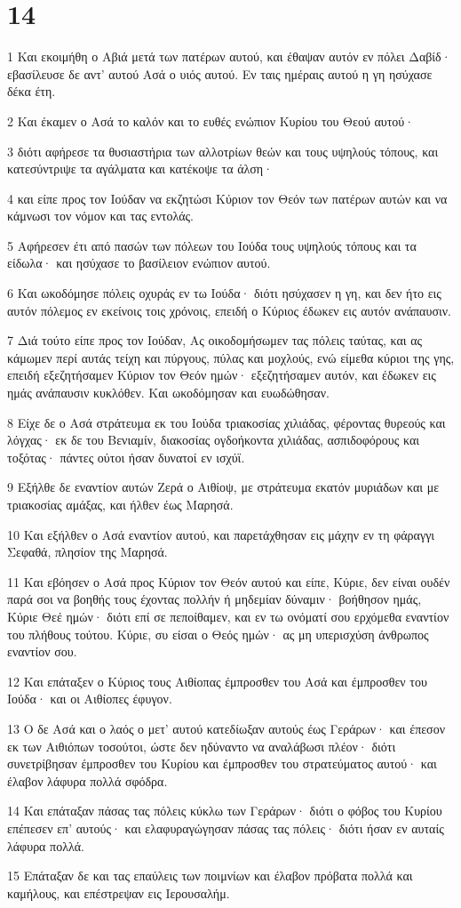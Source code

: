 \chapter{14}

\par 1 Και εκοιμήθη ο Αβιά μετά των πατέρων αυτού, και έθαψαν αυτόν εν πόλει Δαβίδ· εβασίλευσε δε αντ' αυτού Ασά ο υιός αυτού. Εν ταις ημέραις αυτού η γη ησύχασε δέκα έτη.
\par 2 Και έκαμεν ο Ασά το καλόν και το ευθές ενώπιον Κυρίου του Θεού αυτού·
\par 3 διότι αφήρεσε τα θυσιαστήρια των αλλοτρίων θεών και τους υψηλούς τόπους, και κατεσύντριψε τα αγάλματα και κατέκοψε τα άλση·
\par 4 και είπε προς τον Ιούδαν να εκζητώσι Κύριον τον Θεόν των πατέρων αυτών και να κάμνωσι τον νόμον και τας εντολάς.
\par 5 Αφήρεσεν έτι από πασών των πόλεων του Ιούδα τους υψηλούς τόπους και τα είδωλα· και ησύχασε το βασίλειον ενώπιον αυτού.
\par 6 Και ωκοδόμησε πόλεις οχυράς εν τω Ιούδα· διότι ησύχασεν η γη, και δεν ήτο εις αυτόν πόλεμος εν εκείνοις τοις χρόνοις, επειδή ο Κύριος έδωκεν εις αυτόν ανάπαυσιν.
\par 7 Διά τούτο είπε προς τον Ιούδαν, Ας οικοδομήσωμεν τας πόλεις ταύτας, και ας κάμωμεν περί αυτάς τείχη και πύργους, πύλας και μοχλούς, ενώ είμεθα κύριοι της γης, επειδή εξεζητήσαμεν Κύριον τον Θεόν ημών· εξεζητήσαμεν αυτόν, και έδωκεν εις ημάς ανάπαυσιν κυκλόθεν. Και ωκοδόμησαν και ευωδώθησαν.
\par 8 Είχε δε ο Ασά στράτευμα εκ του Ιούδα τριακοσίας χιλιάδας, φέροντας θυρεούς και λόγχας· εκ δε του Βενιαμίν, διακοσίας ογδοήκοντα χιλιάδας, ασπιδοφόρους και τοξότας· πάντες ούτοι ήσαν δυνατοί εν ισχύϊ.
\par 9 Εξήλθε δε εναντίον αυτών Ζερά ο Αιθίοψ, με στράτευμα εκατόν μυριάδων και με τριακοσίας αμάξας, και ήλθεν έως Μαρησά.
\par 10 Και εξήλθεν ο Ασά εναντίον αυτού, και παρετάχθησαν εις μάχην εν τη φάραγγι Σεφαθά, πλησίον της Μαρησά.
\par 11 Και εβόησεν ο Ασά προς Κύριον τον Θεόν αυτού και είπε, Κύριε, δεν είναι ουδέν παρά σοι να βοηθής τους έχοντας πολλήν ή μηδεμίαν δύναμιν· βοήθησον ημάς, Κύριε Θεέ ημών· διότι επί σε πεποίθαμεν, και εν τω ονόματί σου ερχόμεθα εναντίον του πλήθους τούτου. Κύριε, συ είσαι ο Θεός ημών· ας μη υπερισχύση άνθρωπος εναντίον σου.
\par 12 Και επάταξεν ο Κύριος τους Αιθίοπας έμπροσθεν του Ασά και έμπροσθεν του Ιούδα· και οι Αιθίοπες έφυγον.
\par 13 Ο δε Ασά και ο λαός ο μετ' αυτού κατεδίωξαν αυτούς έως Γεράρων· και έπεσον εκ των Αιθιόπων τοσούτοι, ώστε δεν ηδύναντο να αναλάβωσι πλέον· διότι συνετρίβησαν έμπροσθεν του Κυρίου και έμπροσθεν του στρατεύματος αυτού· και έλαβον λάφυρα πολλά σφόδρα.
\par 14 Και επάταξαν πάσας τας πόλεις κύκλω των Γεράρων· διότι ο φόβος του Κυρίου επέπεσεν επ' αυτούς· και ελαφυραγώγησαν πάσας τας πόλεις· διότι ήσαν εν αυταίς λάφυρα πολλά.
\par 15 Επάταξαν δε και τας επαύλεις των ποιμνίων και έλαβον πρόβατα πολλά και καμήλους, και επέστρεψαν εις Ιερουσαλήμ.

